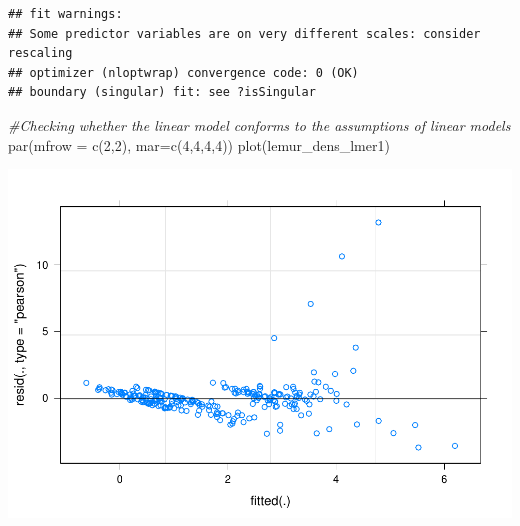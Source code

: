 \documentclass[
  12pt,
]{article}
\newenvironment{Shaded}{\begin{snugshade}}{\end{snugshade}}
\newcommand{\AttributeTok}[1]{\textcolor[rgb]{0.77,0.63,0.00}{#1}}
\newcommand{\CommentTok}[1]{\textcolor[rgb]{0.56,0.35,0.01}{\textit{#1}}}
\newcommand{\DecValTok}[1]{\textcolor[rgb]{0.00,0.00,0.81}{#1}}
\newcommand{\FunctionTok}[1]{\textcolor[rgb]{0.00,0.00,0.00}{#1}}
\newcommand{\NormalTok}[1]{#1}
\newcommand{\SpecialCharTok}[1]{\textcolor[rgb]{0.00,0.00,0.00}{#1}}
\begin{document}
\begin{verbatim}
## fit warnings:
## Some predictor variables are on very different scales: consider rescaling
## optimizer (nloptwrap) convergence code: 0 (OK)
## boundary (singular) fit: see ?isSingular
\end{verbatim}

\begin{Shaded}
\begin{Highlighting}[]
\CommentTok{\#Checking whether the linear model conforms to the assumptions of linear models}
\FunctionTok{par}\NormalTok{(}\AttributeTok{mfrow =} \FunctionTok{c}\NormalTok{(}\DecValTok{2}\NormalTok{,}\DecValTok{2}\NormalTok{), }\AttributeTok{mar=}\FunctionTok{c}\NormalTok{(}\DecValTok{4}\NormalTok{,}\DecValTok{4}\NormalTok{,}\DecValTok{4}\NormalTok{,}\DecValTok{4}\NormalTok{))}
\FunctionTok{plot}\NormalTok{(lemur\_dens\_lmer1)}
\end{Highlighting}
\end{Shaded}

\includegraphics{project_draft_files/figure-latex/unnamed-chunk-4-4.pdf}

\begin{Shaded}
\end{Shaded}
\end{document}
